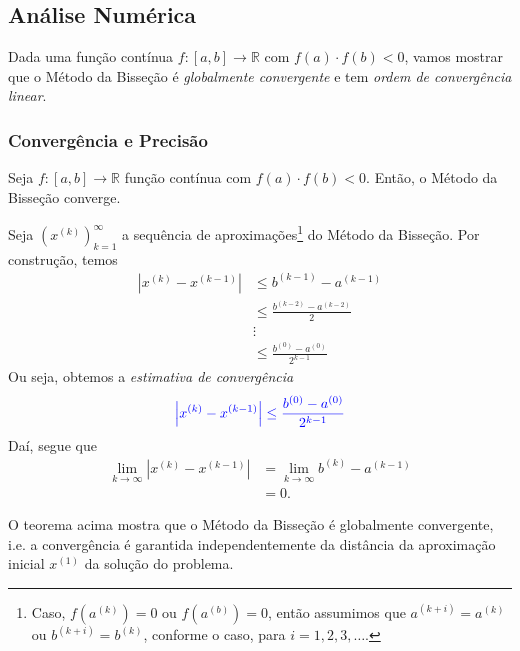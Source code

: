 \subsection{Análise Numérica}

Dada uma função contínua $f:[a, b]\to\mathbb{R}$ com $f(a)\cdot f(b) < 0$, vamos mostrar que o Método da Bisseção é \emph{globalmente convergente} e tem \emph{ordem de convergência linear}.

\subsubsection{Convergência e Precisão}

\begin{teo}\label{cap_eq1d_sec_bissec:teo:convp}
  Seja $f:[a, b]\to\mathbb{R}$ função contínua com $f(a)\cdot f(b) < 0$. Então, o Método da Bisseção converge.
\end{teo}
\begin{dem}
  Seja $(x^{(k)})_{k=1}^\infty$ a sequência de aproximações\footnote{Caso, $f\left(a^{(k)}\right)=0$ ou $f\left(a^{(b)}\right)=0$, então assumimos que $a^{(k+i)} = a^{(k)}$ ou $b^{(k+i)} = b^{(k)}$, conforme o caso, para $i=1,2,3,\ldots$.} do Método da Bisseção. Por construção, temos
  \begin{align}
    \left|x^{(k)} - x^{(k-1)}\right| &\leq b^{(k-1)}-a^{(k-1)}\\
                                     &\leq \frac{b^{(k-2)}-a^{(k-2)}}{2}\\
                                     &\vdots\\
                                     &\leq \frac{b^{(0)}-a^{(0)}}{2^{k-1}}
  \end{align}
  Ou seja, obtemos a \emph{estimativa de convergência}
  \begin{equation}\label{cap_eq1d_sec_bissec:eq:estconvp}
    {\color{blue}\left|x^{(k)} - x^{(k-1)}\right| \leq \frac{b^{(0)}-a^{(0)}}{2^{k-1}}}
  \end{equation}
  Daí, segue que
  \begin{align}
    \lim_{k\to\infty} \left|x^{(k)}-x^{(k-1)}\right| &= \lim_{k\to\infty} b^{(k)}-a^{(k-1)}\\
                                                     &= 0.
  \end{align}
\end{dem}

\begin{obs}
O teorema acima mostra que o Método da Bisseção é globalmente convergente, i.e. a convergência é garantida independentemente da distância da aproximação inicial $x^{(1)}$ da solução do problema.
\end{obs}

